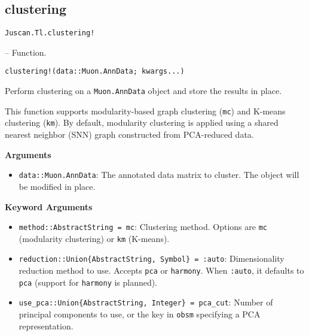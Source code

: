 \documentclass[oneside]{memoir}
\begin{document}
\subsection{clustering}



\label{4392907018613767980}{}

\hypertarget{16046198189929127649}{\texttt{Juscan.Tl.clustering!}}  -- {Function.}

\begin{adjustwidth}{2em}{0pt}


\begin{verbatim}
clustering!(data::Muon.AnnData; kwargs...)
\end{verbatim}

Perform clustering on a \texttt{Muon.AnnData} object and store the results in place.

This function supports modularity-based graph clustering (\texttt{{\textquotedbl}mc{\textquotedbl}}) and K-means clustering (\texttt{{\textquotedbl}km{\textquotedbl}}). By default, modularity clustering is applied using a shared nearest neighbor (SNN) graph constructed from PCA-reduced data.

\textbf{Arguments}

\begin{itemize}
\item \texttt{data::Muon.AnnData}: The annotated data matrix to cluster. The object will be modified in place.

\end{itemize}
\textbf{Keyword Arguments}

\begin{itemize}
\item \texttt{method::AbstractString = {\textquotedbl}mc{\textquotedbl}}: Clustering method. Options are \texttt{{\textquotedbl}mc{\textquotedbl}} (modularity clustering) or \texttt{{\textquotedbl}km{\textquotedbl}} (K-means).


\item \texttt{reduction::Union\{AbstractString, Symbol\} = :auto}: Dimensionality reduction method to use. Accepts \texttt{{\textquotedbl}pca{\textquotedbl}} or \texttt{{\textquotedbl}harmony{\textquotedbl}}. When \texttt{:auto}, it defaults to \texttt{{\textquotedbl}pca{\textquotedbl}} (support for \texttt{{\textquotedbl}harmony{\textquotedbl}} is planned).


\item \texttt{use\_pca::Union\{AbstractString, Integer\} = {\textquotedbl}pca\_cut{\textquotedbl}}: Number of principal components to use, or the key in \texttt{obsm} specifying a PCA representation.



\end{itemize}
\end{adjustwidth}
\end{document}
